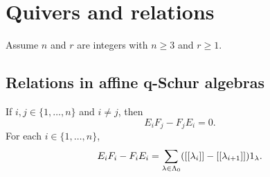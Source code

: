 \documentclass[a4paper, 11pt]{report}
\begin{document}
\section{Quivers and relations}

Assume $n$ and $r$ are integers with $n\geq 3$ and $r\geq 1$.

\subsection{Relations in affine q-Schur algebras}


\begin{lemma}\label{lemma:q-commutators-E-F}
If $i,j\in\{1,\ldots,n\}$ and $i\neq j$, then
\begin{equation*}
E_iF_j - F_jE_i = 0.
\end{equation*}
For each $i\in\{1,\ldots,n\}$,
\begin{equation*}
E_iF_i - F_iE_i = \sum_{\lambda\in\Lambda_0{}} ([[\lambda_i]] - [[\lambda_{i+1}]])1_\lambda.
\end{equation*}
\end{lemma}
\end{document}
